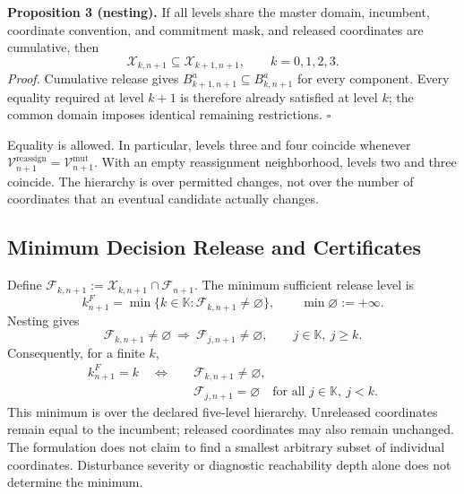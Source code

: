 \medskip
\noindent\textbf{Proposition 3 (nesting).}
If all levels share the master domain, incumbent, coordinate convention,
and commitment mask, and released coordinates are cumulative, then
\begin{equation}
\mathcal X_{k,n+1}\subseteq\mathcal X_{k+1,n+1},
\qquad k=0,1,2,3.
\label{eq:nesting}
\end{equation}
\emph{Proof.}
Cumulative release gives
$B_{k+1,n+1}^a\subseteq B_{k,n+1}^a$ for every component.
Every equality required at level $k+1$ is therefore already satisfied at
level $k$; the common domain imposes identical remaining restrictions.
\hfill$\square$

Equality is allowed. In particular, levels three and four coincide whenever
$\mathcal V_{n+1}^{\mathrm{reassign}}=\mathcal V_{n+1}^{\mathrm{mut}}$.
With an empty reassignment neighborhood, levels two and three coincide.
The hierarchy is over permitted changes, not over the number of coordinates
that an eventual candidate actually changes.


\subsection{Minimum Decision Release and Certificates}
\label{subsec:minimum_escalation}

Define $\mathcal F_{k,n+1}:=\mathcal X_{k,n+1}\cap\mathcal F_{n+1}$.
The minimum sufficient release level is
\begin{equation}
k_{n+1}^F=\min\{k\in\mathbb K:\mathcal F_{k,n+1}\ne\varnothing\},
\qquad \min\varnothing:=+\infty.
\label{eq:feasibility_escalation}
\end{equation}
Nesting gives
\begin{equation}
\mathcal F_{k,n+1}\ne\varnothing
\ \Longrightarrow\
\mathcal F_{j,n+1}\ne\varnothing,\qquad j\in\mathbb K,\ j\ge k.
\label{eq:feasibility_monotonicity}
\end{equation}
Consequently, for a finite $k$,
\begin{equation}
\begin{split}
k_{n+1}^F=k\quad\Longleftrightarrow\quad&
\mathcal F_{k,n+1}\ne\varnothing,\\
&\mathcal F_{j,n+1}=\varnothing
\quad\text{for all }j\in\mathbb K,\ j<k.
\end{split}
\label{eq:minimumharacterization}
\end{equation}
This minimum is over the declared five-level hierarchy. Unreleased
coordinates remain equal to the incumbent; released coordinates may also
remain unchanged. The formulation does not claim to find a smallest
arbitrary subset of individual coordinates. Disturbance severity or
diagnostic reachability depth alone does not determine the minimum.

